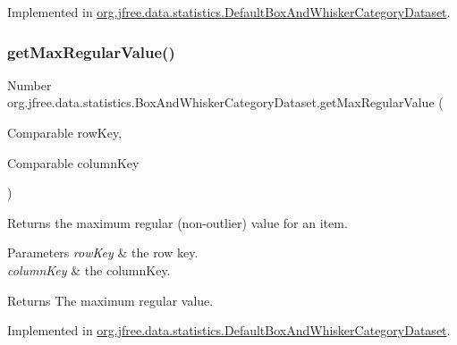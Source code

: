 Implemented in \mbox{\hyperlink{classorg_1_1jfree_1_1data_1_1statistics_1_1_default_box_and_whisker_category_dataset_aef4d0917b5702237fdd138fda594fc24}{org.\+jfree.\+data.\+statistics.\+Default\+Box\+And\+Whisker\+Category\+Dataset}}.

\mbox{\label{interfaceorg_1_1jfree_1_1data_1_1statistics_1_1_box_and_whisker_category_dataset_ae4cff365d11652710865d02e47b81aba}} 
\subsubsection{\texorpdfstring{get\+Max\+Regular\+Value()}{getMaxRegularValue()}\hspace{0.1cm}{\footnotesize\ttfamily [2/2]}}
{\footnotesize\ttfamily Number org.\+jfree.\+data.\+statistics.\+Box\+And\+Whisker\+Category\+Dataset.\+get\+Max\+Regular\+Value (\begin{DoxyParamCaption}\item[{Comparable}]{row\+Key,  }\item[{Comparable}]{column\+Key }\end{DoxyParamCaption})}

Returns the maximum regular (non-\/outlier) value for an item.


\begin{DoxyParams}{Parameters}
{\em row\+Key} & the row key. \\
\hline
{\em column\+Key} & the column\+Key.\\
\hline
\end{DoxyParams}
\begin{DoxyReturn}{Returns}
The maximum regular value. 
\end{DoxyReturn}


Implemented in \mbox{\hyperlink{classorg_1_1jfree_1_1data_1_1statistics_1_1_default_box_and_whisker_category_dataset_acd767ade9e48d8733e4ee21a3b2ed95b}{org.\+jfree.\+data.\+statistics.\+Default\+Box\+And\+Whisker\+Category\+Dataset}}.

